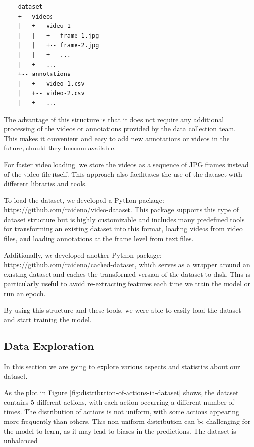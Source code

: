 \begin{verbatim}
    dataset
    +-- videos
    |   +-- video-1
    |   |   +-- frame-1.jpg
    |   |   +-- frame-2.jpg
    |   |   +-- ...
    |   +-- ...
    +-- annotations
    |   +-- video-1.csv
    |   +-- video-2.csv
    |   +-- ...
\end{verbatim}

The advantage of this structure is that it does not require any additional processing of the videos or annotations provided by the data collection team. This makes it convenient and easy to add new annotations or videos in the future, should they become available.

For faster video loading, we store the videos as a sequence of JPG frames instead of the video file itself. This approach also facilitates the use of the dataset with different libraries and tools.

To load the dataset, we developed a Python package: \href{https://github.com/raideno/video-dataset}{https://github.com/raideno/video-dataset}. This package supports this type of dataset structure but is highly customizable and includes many predefined tools for transforming an existing dataset into this format, loading videos from video files, and loading annotations at the frame level from text files.

Additionally, we developed another Python package: \href{https://github.com/raideno/cached-dataset}{https://github.com/raideno/cached-dataset}, which serves as a wrapper around an existing dataset and caches the transformed version of the dataset to disk. This is particularly useful to avoid re-extracting features each time we train the model or run an epoch.

By using this structure and these tools, we were able to easily load the dataset and start training the model.

\subsection{Data Exploration}

In this section we are going to explore various aspects and statistics about our dataset.

As the plot in Figure \ref{fig:distribution-of-actions-in-dataset} shows, the dataset contains 5 different actions, with each action occurring a different number of times. The distribution of actions is not uniform, with some actions appearing more frequently than others. This non-uniform distribution can be challenging for the model to learn, as it may lead to biases in the predictions. The dataset is unbalanced

